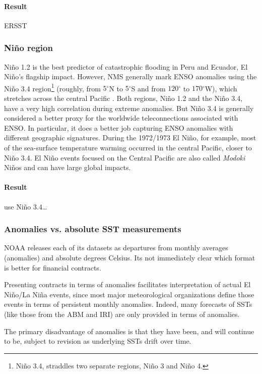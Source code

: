 \documentclass[authoryear]{article}
\newcommand{\degreesym}{\ensuremath{^\circ}}
\begin{document}
\paragraph{Result}
ERSST

\subsubsection{Ni\~no region}
Ni\~no 1.2 is the best predictor of catastrophic flooding in Peru and Ecuador, El Ni\~no's flagship impact. However, NMS generally mark ENSO anomalies using the Ni\~no 3.4 region\footnote{Ni\~no 3.4, straddles two separate regions, Ni\~no 3 and Ni\~no 4.} (roughly, from $5\degreesym$N to $5\degreesym$S and from $120\degreesym$ to $170\degreesym$W), which stretches across the central Pacific\cite{khalil2007Nino} \cite{barnston1997documentation}. Both regions, Ni\~no 1.2 and the Ni\~no 3.4, have a very high correlation during extreme anomalies. But Ni\~no 3.4 is generally considered a better proxy for the worldwide teleconnections associated with ENSO. In particular,  it does a better job capturing ENSO anomalies with different geographic signatures. During the 1972/1973 El Ni\~no, for example, most of the sea-surface temperature warming occurred in the central Pacific, closer to Ni\~no 3.4. El Ni\~no events focused on the Central Pacific are also called \emph{Modoki} Ni\~nos and can have large global impacts\cite{ashok2007Nino}.

\paragraph{Result}
use Ni\~no 3.4…

\subsubsection{Anomalies vs. absolute SST measurements}
NOAA releases each of its datasets as departures from monthly averages (anomalies) and absolute degrees Celsius. Its not immediately clear which format is better for financial contracts.

Presenting contracts in terms of anomalies facilitates interpretation of actual El Ni\~no/La Ni\~na events, since most major meteorological organizations define those events in terms of persistent monthly anomalies. Indeed, many forecasts of SSTs (like those from the ABM and IRI) are only provided in terms of anomalies. 

The primary disadvantage of anomalies is that they have been, and will continue to be, subject to revision as underlying SSTs drift over time. 
\end{document}
